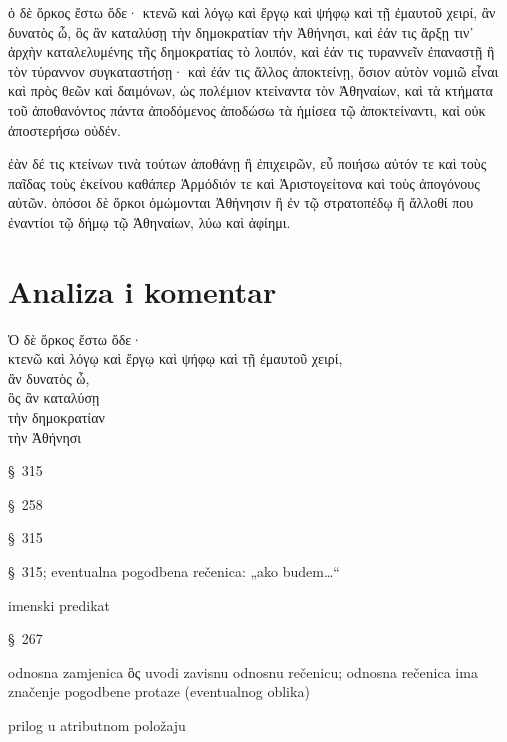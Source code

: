 {\large

\begin{greek}

\noindent ὁ δὲ ὅρκος ἔστω ὅδε· κτενῶ καὶ λόγῳ καὶ ἔργῳ καὶ ψήφῳ καὶ τῇ ἐμαυτοῦ χειρί, ἂν δυνατὸς ὦ, ὃς ἂν καταλύσῃ τὴν δημοκρατίαν τὴν Ἀθήνησι, καὶ ἐάν τις ἄρξῃ τιν᾽ ἀρχὴν καταλελυμένης τῆς δημοκρατίας τὸ λοιπόν, καὶ ἐάν τις τυραννεῖν ἐπαναστῇ ἢ τὸν τύραννον συγκαταστήσῃ· καὶ ἐάν τις ἄλλος ἀποκτείνῃ, ὅσιον αὐτὸν νομιῶ εἶναι καὶ πρὸς θεῶν καὶ δαιμόνων, ὡς πολέμιον κτείναντα τὸν Ἀθηναίων, καὶ τὰ κτήματα τοῦ ἀποθανόντος πάντα ἀποδόμενος ἀποδώσω τὰ ἡμίσεα τῷ ἀποκτείναντι, καὶ οὐκ ἀποστερήσω οὐδέν.

ἐὰν δέ τις κτείνων τινὰ τούτων ἀποθάνῃ ἢ ἐπιχειρῶν, εὖ ποιήσω αὐτόν τε καὶ τοὺς παῖδας τοὺς ἐκείνου καθάπερ Ἁρμόδιόν τε καὶ Ἀριστογείτονα καὶ τοὺς ἀπογόνους αὐτῶν. ὁπόσοι δὲ ὅρκοι ὀμώμονται Ἀθήνησιν ἢ ἐν τῷ στρατοπέδῳ ἢ ἄλλοθί που ἐναντίοι τῷ δήμῳ τῷ Ἀθηναίων, λύω καὶ ἀφίημι.

\end{greek}

}


\section*{Analiza i komentar}


{\large
\begin{greek}
\noindent Ὁ δὲ ὅρκος ἔστω ὅδε·  \\
\tabto{2em} κτενῶ καὶ λόγῳ καὶ ἔργῳ καὶ ψήφῳ καὶ τῇ ἐμαυτοῦ χειρί, \\
\tabto{4em} ἂν δυνατὸς ὦ, \\
\tabto{2em} ὃς ἂν καταλύσῃ \\
\tabto{4em} τὴν δημοκρατίαν \\
\tabto{6em} τὴν Ἀθήνησι\\

\end{greek}
}

\begin{description}[noitemsep]
\item[ἔστω] §~315
\item[κτενῶ] §~258
\item[ὦ] §~315
\item[ἂν δυνατὸς ὦ] §~315; eventualna pogodbena rečenica: „ako budem…“
\item[δυνατὸς ὦ] imenski predikat
\item[καταλύσῃ] §~267
\item[ὃς ἂν καταλύσῃ] odnosna zamjenica ὃς uvodi zavisnu odnosnu rečenicu; odnosna rečenica ima značenje pogodbene protaze (eventualnog oblika)
\item[τὴν δημοκρατίαν τὴν Ἀθήνησι] prilog u atributnom položaju

\end{description}

